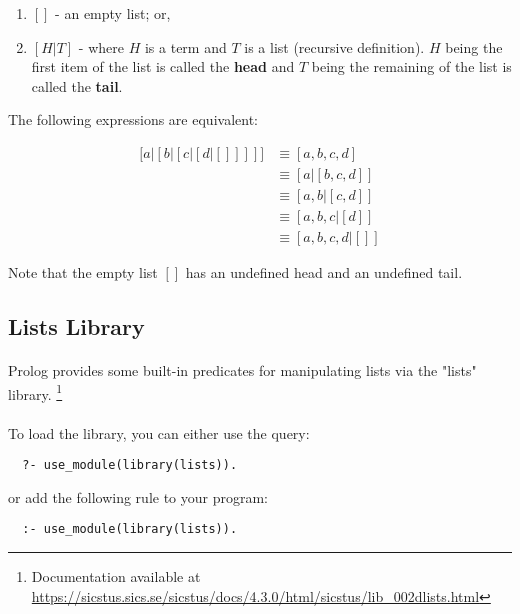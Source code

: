 \documentclass{article}
\begin{document}
\begin{multicols}{2}
  \begin{enumerate}
  \item $[]$ - an empty list; or,
  \item $[H|T]$ - where $H$ is a term and $T$ is a list (recursive definition). $H$ being the first item of the list is called the {\bf head} and $T$ being the remaining of the list is called the {\bf tail}.
  \end{enumerate}
  
  \noindent The following expressions are equivalent:
  
  \begin{equation*}
  \begin{aligned}
  \big [ a \vert [ b \vert [ c \vert [ d \vert []]]] \big] & \equiv [a,b,c,d] \\
  & \equiv [a|[b,c,d]] \\
  & \equiv [a,b|[c,d]] \\
  & \equiv [a,b,c|[d]] \\
  & \equiv [a,b,c,d|[]]
  \end{aligned}
  \end{equation*}  
  
  \noindent Note that the empty list $[]$ has an undefined head and an undefined tail.  
  
  \subsection{Lists Library}
  
  \paragraph{} Prolog provides some built-in predicates for manipulating lists via the "lists" library. \footnote{Documentation available at \url{https://sicstus.sics.se/sicstus/docs/4.3.0/html/sicstus/lib_002dlists.html}}
  
  \paragraph{} To load the library, you can either use the query:
  
  \begin{lstlisting}
  ?- use_module(library(lists)).
  \end{lstlisting}
  
  or add the following rule to your program:

  \begin{lstlisting}
  :- use_module(library(lists)).
  \end{lstlisting}
  

\end{multicols}
\end{document}
